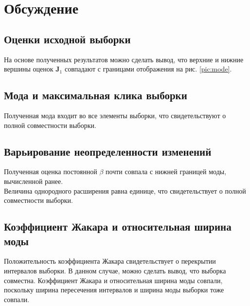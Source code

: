 \documentclass[./main.tex]{subfiles}
\begin{document}
\section{Обсуждение}

\subsection{Оценки исходной выборки} 

На основе полученных результатов можно сделать вывод, что верхние и нижние вершины оценок $\bm{J}_1$ совпадают с границами отображения на рис. \ref{pic:mode}.

\subsection{Мода и максимальная клика выборки} 

Полученная мода входит во все элементы выборки, что свидетельствуют о полной совместности выборки.

\subsection{Варьирование неопределенности изменений}

Полученная оценка постоянной $\beta$ почти совпала с нижней границей моды, вычисленной ранее. \\
Величина однородного расширения равна единице, что свидетельствует о полной совместности выборки.

\subsection{Коэффициент Жакара и относительная ширина моды}

Положительность коэффициента Жакара свидетельствует о перекрытии интервалов выборки. В данном случае, можно сделать вывод, что выборка совместна. Коэффициент Жакара и относительная ширина моды совпали, поскольку ширина пересечения интервалов и ширина моды выборки тоже совпали. \\

\newpage
\end{document}
